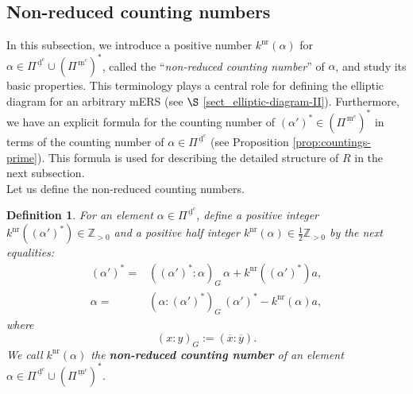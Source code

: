 \documentclass[11pt]{amsart}
\newcommand{\Z}{\mathbb{Z}}
\newcommand{\nr}{\mathrm{nr}}
\newcommand{\dc}{\,\underline{\mathrm{d}}^c}
\newcommand{\mc}{\, \underline{\mathrm{m}}^c}
\newtheorem{defn}{Definition}[section]
\begin{document}
{\subsection{Non-reduced counting numbers}\label{sect:NRCN}
In this subsection, we introduce a positive number $k^{\nr}(\alpha)$ for 
$\alpha\in\Pi^{\dc}\cup (\Pi^{\mc})^*$, called the ``{\it non-reduced counting number}'' of 
$\alpha$, and study its basic properties. This terminology plays a central role for 
defining the elliptic diagram for an arbitrary mERS 
(see $\S$ \ref{sect_elliptic-diagram-II}). Furthermore, 
we have an explicit formula for the counting number of $(\alpha')^\ast\in (\Pi^{\mc})^\ast$ 
in terms of the counting number 
of $\alpha\in \Pi^{\dc}$ (see Proposition \ref{prop:countings-prime}). 
This formula is used for describing the detailed structure of $R$ in the next 
subsection.     \\
 
Let us define the non-reduced counting numbers.
\begin{defn}
For an element $\alpha \in \Pi^{\dc}$, define a positive integer
$k^{\nr}((\alpha')^\ast)\in \Z_{>0}$\index[notations]{k711@$k^{\nr}((\alpha')^\ast)$} and 
a positive half integer 
$k^{\nr}(\alpha)\in\frac12 \Z_{>0}$ by the next equalities{\rm :}
\begin{align} 
(\alpha')^\ast=&((\alpha')^\ast:\alpha)_G\,\alpha + k^{\nr}((\alpha')^\ast)a, 
\label{defn:nr-countings_alpha'-ast}
\\
\alpha=&(\alpha:(\alpha')^\ast)_G\,(\alpha')^\ast-k^{\nr}(\alpha)a,
\label{defn:nr-countings_alpha}
\end{align}
where 
\begin{equation*}
(x:y)_G:=(\overline{x}:\overline{y}).
\end{equation*}
We call $k^{\nr}(\alpha)$\index[notations]{k712@$k^{\nr}(\alpha)$} the 
\textbf{non-reduced counting number}  
of an element $\alpha\in \Pi^{\dc}\cup (\Pi^{\mc})^\ast$.
\end{defn}

}
\end{document}
